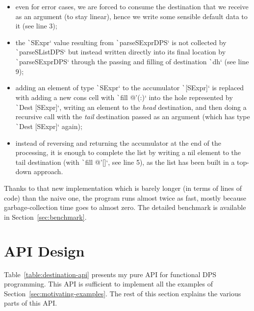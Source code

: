 \documentclass[english]{jflart}
\begin{document}
\begin{itemize}
  \item even for error cases, we are forced to consume the destination that we receive as an argument (to stay linear), hence we write some sensible default data to it (see line 3);
  \item the \texttt`SExpr` value resulting from \texttt`parseSExprDPS` is not collected by \texttt`parseSListDPS` but instead written directly into its final location by \texttt`parseSExprDPS` through the passing and filling of destination \texttt`dh` (see line 9);
  \item adding an element of type \texttt`SExpr` to the accumulator \texttt`[SExpr]` is replaced with adding a new cons cell with \texttt`fill @'(:)` into the hole represented by \texttt`Dest [SExpr]`, writing an element to the \emph{head} destination, and then doing a recursive call with the \emph{tail} destination passed as an argument (which has type \texttt`Dest [SExpr]` again);
  \item instead of reversing and returning the accumulator at the end of the processing, it is enough to complete the list by writing a nil element to the tail destination (with \texttt`fill @'[]`, see line 5), as the list has been built in a top-down approach.
\end{itemize}

Thanks to that new implementation which is barely longer (in terms of lines of code) than the naive one, the program runs almost twice as fast, mostly because garbage-collection time goes to almost zero. The detailed benchmark is available in Section~\ref{sec:benchmark}.

\section{API Design}\label{sec:api}

Table~\ref{table:destination-api} presents my pure API for functional DPS programming. This API is sufficient to implement all the examples of Section~\ref{sec:motivating-examples}. The rest of this section explains the various parts of this API.
\end{document}
